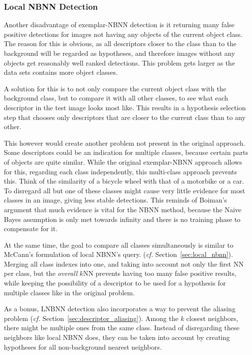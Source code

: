 \subsubsection{Local NBNN Detection} %
\label{ssub:local_nbnn_detection}

Another disadvantage of exemplar-NBNN detection is it returning many false positive detections for images not having any objects of the current object class. The reason for this is obvious, as all descriptors closer to the class than to the background will be regarded as hypotheses, and therefore images without any objects get reasonably well ranked detections. This problem gets larger as the data sets contains more object classes.

A solution for this is to not only compare the current object class with the background class, but to compare it with all other classes, to see what each descriptor in the test image looks most like. This results in a hypothesis selection step that chooses only descriptors that are closer to the current class than to any other.

This however would create another problem not present in the original approach. Some descriptors could be an indication for multiple classes, because certain parts of objects are quite similar. While the original exemplar-NBNN approach allows for this, regarding each class independently, this multi-class approach prevents this. Think of the similarity of a bicycle wheel with that of a motorbike or a car. To disregard all but one of these classes might cause very little evidence for most classes in an image, giving less stable detections. This reminds of Boiman's argument that much evidence is vital for the NBNN method, because the Naive Bayes assumption is only met towards infinity and there is no training phase to compensate for it. \cite{boiman2008defense}

At the same time, the goal to compare all classes simultaneously is similar to McCann's formulation of local NBNN's query. \cite{mccann2012local} (\emph{cf.} Section~\ref{sec:local_nbnn}). Merging all class indexes into one, and taking into account not only the first NN per class, but the \emph{overall} $k$NN prevents having too many false positive results, while keeping the possibility of a descriptor to be used for a hypothesis for multiple classes like in the original problem.

As a bonus, LNBNN detection also incorporates a way to prevent the aliasing problem (\emph{cf.} Section~\ref{sec:descriptor_aliasing}). Among the $k$ closest neighbors, there might be multiple ones from the same class. Instead of disregarding these neighbors like local NBNN does, they can be taken into account by creating hypotheses for all non-background nearest neighbors.

